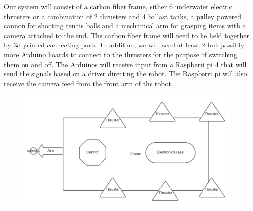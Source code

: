Our system will consist of a carbon fiber frame, either 6 underwater electric thrusters or a combination of 2 thrusters and 4 ballast tanks, a pulley powered cannon for shooting tennis balls and a mechanical arm for grasping items with a camera attached to the end. 
The carbon fiber frame will need to be held together by 3d printed connecting parts. In addition, we will need at least 2 but possibly more Arduino boards to connect to the thrusters for the purpose of switching them on and off. The Arduinos will receive input from a Raspberri pi 4 that will send the signals based on a driver directing the robot. The Raspberri pi will also receive the camera feed from the front arm of the robot.


\begin{figure}[h!]
	\includegraphics{images/initial_diagram.png}
\end{figure}
